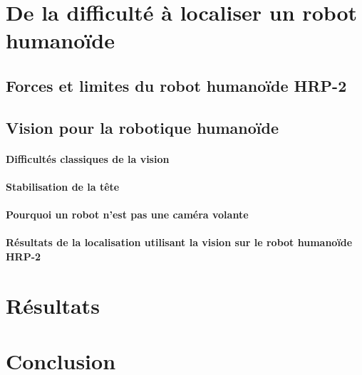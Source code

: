 \section{De la difficulté à localiser un robot humanoïde}
\subsection{Forces et limites du robot humanoïde HRP-2}
\subsection{Vision pour la robotique humanoïde}
\paragraph{Difficultés classiques de la vision}
\paragraph{Stabilisation de la tête}
\paragraph{Pourquoi un robot n'est pas une caméra volante}
\paragraph{Résultats de la localisation utilisant la vision sur le robot humanoïde HRP-2}

\section{Résultats}

\section{Conclusion}

